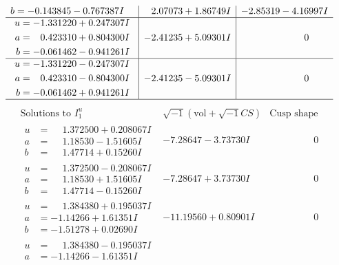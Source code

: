 \documentclass[1p]{elsarticle_modified}
\theoremstyle{definition}
\newcommand{\I}{\sqrt{-1}}
\begin{document}
$$\begin{array}{c|c|c}
\begin{aligned}
b &= -0.143845 - 0.767387 I\end{aligned}
 & \phantom{-}2.07073 + 1.86749 I & -2.85319 - 4.16997 I \\ \hline\begin{aligned}
u &= -1.331220 + 0.247307 I \\
a &= \phantom{-}0.423310 + 0.804300 I \\
b &= -0.061462 - 0.941261 I\end{aligned}
 & -2.41235 + 5.09301 I & \phantom{-0.000000 } 0 \\ \hline\begin{aligned}
u &= -1.331220 - 0.247307 I \\
a &= \phantom{-}0.423310 - 0.804300 I \\
b &= -0.061462 + 0.941261 I\end{aligned}
 & -2.41235 - 5.09301 I & \phantom{-0.000000 } 0\\
 \hline 
 \end{array}$$\newpage$$\begin{array}{c|c|c}  
\text{Solutions to }I^u_{1}& \I (\text{vol} + \sqrt{-1}CS) & \text{Cusp shape}\\
 \hline 
\begin{aligned}
u &= \phantom{-}1.372500 + 0.208067 I \\
a &= \phantom{-}1.18530 - 1.51605 I \\
b &= \phantom{-}1.47714 + 0.15260 I\end{aligned}
 & -7.28647 - 3.73730 I & \phantom{-0.000000 } 0 \\ \hline\begin{aligned}
u &= \phantom{-}1.372500 - 0.208067 I \\
a &= \phantom{-}1.18530 + 1.51605 I \\
b &= \phantom{-}1.47714 - 0.15260 I\end{aligned}
 & -7.28647 + 3.73730 I & \phantom{-0.000000 } 0 \\ \hline\begin{aligned}
u &= \phantom{-}1.384380 + 0.195037 I \\
a &= -1.14266 + 1.61351 I \\
b &= -1.51278 + 0.02690 I\end{aligned}
 & -11.19560 + 0.80901 I & \phantom{-0.000000 } 0 \\ \hline\begin{aligned}
u &= \phantom{-}1.384380 - 0.195037 I \\
a &= -1.14266 - 1.61351 I \\

\end{aligned}
\end{array}$$
\end{document}

